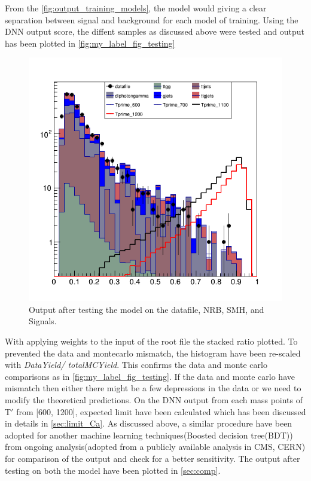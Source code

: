 From the \autoref{fig:output_training_models}, the model would giving a clear separation between signal and background for each model of training. Using the DNN output score, the diffent samples as discussed above were tested and output has been plotted in \autoref{fig:my_label_fig_testing}
\begin{figure}[H]
    \centering
    \includegraphics[scale=0.4]{Results_outputs/output_After_testing.png}
    \caption{Output after testing the model on the datafile, NRB, SMH, and Signals.}
    \label{fig:my_label_fig_testing}
\end{figure}



With applying weights to the input of the root file the stacked ratio plotted. To prevented the data and montecarlo mismatch, the histogram have been re-scaled with \textit{DataYield/ totalMCYield}.
 This confirms the data and monte carlo comparisons as in \autoref{fig:my_label_fig_testing}. If the data and monte carlo have mismatch then either there might be a few depressions in the data or we need to modify the theoretical predictions. 
On the DNN output from each mass points of T$'$ from [600, 1200], expected limit have been calculated which has been discussed in details in \autoref{sec:limit_Ca}. 
As discussed above, a similar procedure have been adopted for another machine learning techniques(Boosted decision tree(BDT)) from ongoing analysis(adopted from a publicly available analysis in CMS, CERN) for comparison of the output and check for a better sensitivity. The output after testing on both the model have been plotted in \autoref{sec:comp}.



\setcounter{equation}{0}
\setcounter{table}{0}
\setcounter{figure}{0}


    
           


 




 
 
